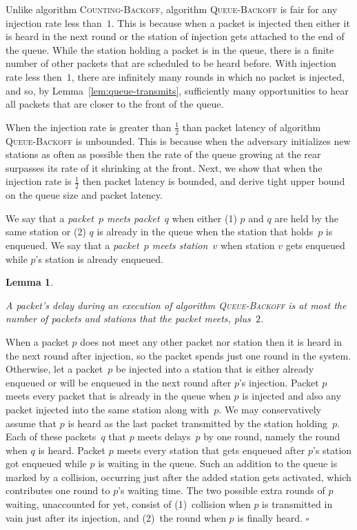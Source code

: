 \documentclass[11pt]{article}
\newcommand{\qed}{\hfill $\square$ \smallbreak}
\newenvironment{proof}{\noindent{\bf Proof:}}{\qed}
\newtheorem{lemma}{Lemma}
\begin{document}
Unlike algorithm \textsc{Counting-Backoff}, algorithm \textsc{Queue-Backoff} is fair for any injection rate less than~$1$.
This is because when a packet is injected then either it is heard in the next round or the station of injection gets attached to the end of the queue. 
While the station holding a packet is in the queue, there is a finite number of other packets that are scheduled to be heard before.
With injection rate less then~$1$, there are infinitely many rounds in which no packet is injected, and so, by Lemma~\ref{lem:queue-transmits}, sufficiently many opportunities to hear all packets that are closer to the front of the queue.

When the injection rate is greater than $\frac{1}{2}$ than packet latency of algorithm \textsc{Queue-Backoff} is unbounded.
This is because when the adversary initializes new stations as often as possible then the rate of the queue growing at the rear surpasses its rate of it shrinking at the front.
Next, we show that when the injection rate is $\frac{1}{2}$ then packet latency is bounded, and derive tight upper bound on the queue size and packet latency.

We say that a \emph{packet~$p$ meets packet~$q$} when either (1) $p$ and $q$ are held by the same station or (2) $q$ is already in the queue when the station that holds~$p$ is enqueued.
We say that a \emph{packet~$p$ meets station~$v$} when station $v$ gets enqueued while $p$'s station is already enqueued.

\begin{lemma}
\label{lem:meeting-packets}

A packet's delay during an execution of algorithm \textsc{Queue-Backoff} is at most the number of packets and stations that the packet meets, plus~$2$.
\end{lemma}

\begin{proof}
When a packet $p$ does not meet any other packet nor station then it is  heard in the next round after injection, so the packet spends just one round in the system.
Otherwise, let a packet~$p$ be injected into a station that is either already enqueued or will be enqueued in the next round after $p$'s injection.
Packet $p$ meets every packet that is already in the queue when $p$ is injected and also any packet injected into the same station along with~$p$.
We may conservatively assume that $p$ is heard as the last packet transmitted by the station holding~$p$.
Each of these packets~$q$ that $p$ meets delays~$p$ by one round, namely the round when $q$ is heard.
Packet $p$ meets every station that gets enqueued after $p$'s station got enqueued while $p$ is waiting in the queue.
Such an addition to the queue is marked by a collision, occurring just after the added station gets activated, which  contributes one round to $p$'s waiting time.
The two possible extra rounds of $p$ waiting, unaccounted for yet, consist of (1)~collision when $p$ is transmitted in vain just after its injection, and (2)~the round when $p$ is finally heard.
\end{proof}
\end{document}
